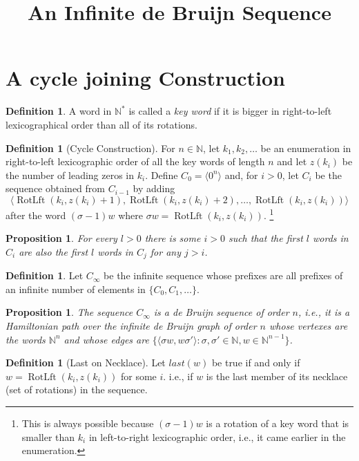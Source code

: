 \documentclass{article}
\title{An Infinite de Bruijn Sequence}
\author{}
\newtheorem{proposition}[theorem]{Proposition}
\theoremstyle{definition}
\newtheorem{definition}[theorem]{Definition}
\DeclareMathOperator{\RotateLeft}{RotLft}
\newcommand{\N}{{\mathbb{N}}}
\newcommand{\T}[1]{\langle{#1}\rangle}
\begin{document}
\maketitle

\section{A cycle joining Construction}


\begin{definition}
	A word in $\N^*$ is called a \emph{key word} if it is bigger in right-to-left lexicographical order than all of its rotations.
\end{definition}

\begin{definition}[Cycle Construction]
For $n\in \N$, let $k_1,k_2,\dots$ be an enumeration in right-to-left lexicographic order of all the key words of length $n$ and let $z(k_i)$ be the number of leading zeros in $k_i$. Define $C_0=\T{0^n}$ and, for $i>0$, let $C_i$ be the sequence obtained from $C_{i-1}$ by adding 
	$$\T{\RotateLeft(k_i,z(k_i)+1),\RotateLeft(k_i,z(k_i)+2),\dots,\RotateLeft(k_i,z(k_i))}$$ 
after the word $(\sigma-1)w$ where $\sigma w=\RotateLeft(k_i,z(k_i))$. \footnote{This is always possible because  $(\sigma-1)w$ is a rotation of a key word that is smaller than $k_i$ in left-to-right lexicographic order, i.e., it came earlier in the enumeration.}  
\end{definition}


\begin{proposition}
For every $l>0$ there is some $i>0$ such that the first $l$ words in $C_i$ are also the first $l$ words in $C_j$ for any $j>i$.
\end{proposition}

\begin{definition}
Let $C_\infty$ be the infinite sequence whose prefixes are all prefixes of an infinite number of elements in $\{C_0,C_1,\dots\}$.
\end{definition}

\begin{proposition}
The sequence $C_\infty$ is a de Bruijn sequence of order $n$, i.e., it is a Hamiltonian path over the infinite de Bruijn graph of order $n$ whose vertexes are the words $\N^n$ and whose edges are $\{ \T{ \sigma w, w \sigma'} \colon \sigma, \sigma' \in \N, w \in \N^{n-1} \}$.
\end{proposition}


\begin{definition}[Last on Necklace]
Let $last(w)$ be true if and only if $w=\RotateLeft(k_i,z(k_i))$ for some $i$. i.e., if $w$ is the last member of its necklace (set of rotations) in the sequence. 
\end{definition}
\end{document}
